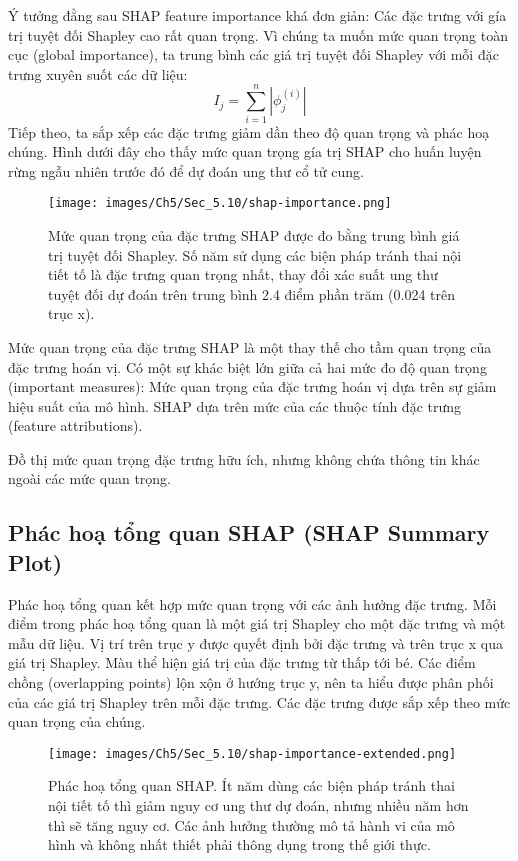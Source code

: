\begin{enumerate}
Ý tưởng đằng sau SHAP feature importance khá đơn giản: Các đặc trưng với gía trị tuyệt đối Shapley cao rất quan trọng. Vì chúng ta muốn mức quan trọng toàn cục (global importance), ta trung bình các giá trị tuyệt đối Shapley với mỗi đặc trưng xuyên suốt các dữ liệu:
$$I_j=\sum_{i=1}^n{}|\phi_j^{(i)}|$$
Tiếp theo, ta sắp xếp các đặc trưng giảm dần theo độ quan trọng và phác hoạ chúng. Hình dưới đây cho thấy mức quan trọng gía trị SHAP cho huấn luyện rừng ngẫu nhiên trước đó để dự đoán ung thư cổ tử cung.

\begin{figure*}[h!]
	\centering
	\texttt{[image: images/Ch5/Sec\_5.10/shap-importance.png]}
	\label{fig:5_51}
	\caption{Mức quan trọng của đặc trưng SHAP được đo bằng trung bình giá trị tuyệt đối Shapley. Số năm sử dụng các biện pháp tránh thai nội tiết tố là đặc trưng quan trọng nhất, thay đổi xác suất ung thư tuyệt đối dự đoán trên trung bình 2.4 điểm phần trăm (0.024 trên trục x).}
\end{figure*}

Mức quan trọng của đặc trưng SHAP là một thay thế cho tầm quan trọng của đặc trưng hoán vị. Có một sự khác biệt lớn giữa cả hai mức đo độ quan trọng (important measures): Mức quan trọng của đặc trưng hoán vị dựa trên sự giảm hiệu suất của mô hình. SHAP dựa trên mức của các thuộc tính đặc trưng (feature attributions).

Đồ thị mức quan trọng đặc trưng hữu ích, nhưng không chứa thông tin khác ngoài các mức quan trọng.



\subsection{Phác hoạ tổng quan SHAP (SHAP Summary Plot)}

Phác hoạ tổng quan kết hợp mức quan trọng với các ảnh hưởng đặc trưng. Mỗi điểm trong phác hoạ tổng quan là một giá trị Shapley cho một đặc trưng và một mẫu dữ liệu. Vị trí trên trục y được quyết định bởi đặc trưng và trên trục x qua giá trị Shapley. Màu thể hiện giá trị của đặc trưng từ thấp tới bé. Các điểm chồng (overlapping points) lộn xộn ở hướng trục y, nên ta hiểu được phân phối của các giá trị Shapley trên mỗi đặc trưng. Các đặc trưng được sắp xếp theo mức quan trọng của chúng.  

\begin{figure*}[h!]
	\centering
	\texttt{[image: images/Ch5/Sec\_5.10/shap-importance-extended.png]}
	\label{fig:5_52}
	\caption{Phác hoạ tổng quan SHAP. Ít năm dùng các biện pháp tránh thai nội tiết tố thì giảm nguy cơ ung thư dự đoán, nhưng nhiều năm hơn thì sẽ tăng nguy cơ. Các ảnh hưởng thường mô tả hành vi của mô hình và không nhất thiết phải thông dụng trong thế giới thực.}
\end{figure*}


\end{enumerate}
